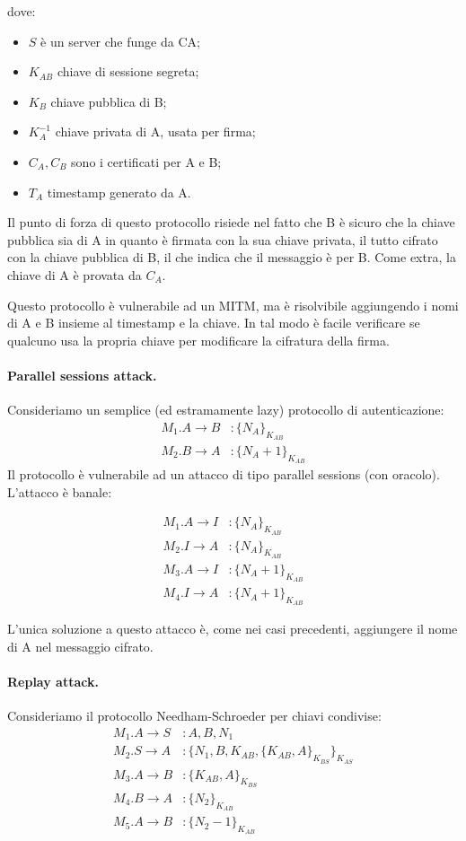 \documentclass[a4paper, 10pt, twoside]{article}
\begin{document}
	dove: \begin{itemize}
		\item $S$ è un server che funge da CA;
		\item $K_{AB}$ chiave di sessione segreta;
		\item $K_B$ chiave pubblica di B;
		\item $K_A^{-1}$ chiave privata di A, usata per firma;
		\item $C_A, C_B$ sono i certificati per A e B;
		\item $T_A$ timestamp generato da A.
	\end{itemize}

	Il punto di forza di questo protocollo risiede nel fatto che B è sicuro che la chiave pubblica sia di A in quanto è firmata con la sua chiave privata, il tutto cifrato con la chiave pubblica di B, il che indica che il messaggio è per B. Come extra, la chiave di A è provata da $C_A$.

	Questo protocollo è vulnerabile ad un MITM, ma è risolvibile aggiungendo i nomi di A e B insieme al timestamp e la chiave. In tal modo è facile verificare se qualcuno usa la propria chiave per modificare la cifratura della firma.

	\paragraph{Parallel sessions attack.} Consideriamo un semplice (ed estramamente lazy) protocollo di autenticazione: \begin{align*}
		M_1. A \to B&: \lbrace N_A\rbrace_{K_{AB}}\\
		M_2. B \to A&: \lbrace N_A + 1 \rbrace_{K_{AB}}
	\end{align*}
	Il protocollo è vulnerabile ad un attacco di tipo parallel sessions (con oracolo).
	L'attacco è banale:

	\begin{align*}
		M_1. A \to I&: \lbrace N_A\rbrace_{K_{AB}}\\
		M_2. I \to A&: \lbrace N_A \rbrace_{K_{AB}}\\
		M_3. A \to I&: \lbrace N_A + 1\rbrace_{K_{AB}}\\
		M_4. I \to A&: \lbrace N_A + 1 \rbrace_{K_{AB}}
	\end{align*}

	L'unica soluzione a questo attacco è, come nei casi precedenti, aggiungere il nome di A nel messaggio cifrato.

	\paragraph{Replay attack.} Consideriamo il protocollo Needham-Schroeder per chiavi condivise: \begin{align*}
		M_1. A \to S&: A, B, N_1 \\
		M_2. S \to A&: \lbrace N_1, B, K_{AB}, \lbrace K_{AB}, A\rbrace_{K_{BS}} \rbrace_{K_{AS}} \\
		M_3. A \to B&: \lbrace K_{AB}, A\rbrace_{K_{BS}} \\
		M_4. B \to A&: \lbrace N_2\rbrace_{K_{AB}}\\
		M_5. A \to B&: \lbrace N_2-1\rbrace_{K_{AB}}
	\end{align*}
\end{document}
